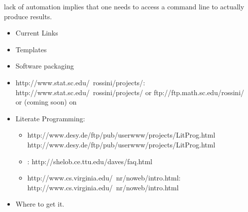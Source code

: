 \documentclass[semhelv]{seminar}
\begin{document}
lack of automation implies that one needs to access a command line to
actually produce results.
 
\begin{itemize}
\item Current Links
\end{itemize}

\begin{slide}

\end{slide}

\begin{itemize}
\item Templates
\item Software packaging
\end{itemize}

\begin{slide}

  \begin{itemize}
  \item {}
    {http://www.stat.sc.edu/~rossini/projects/}:
    {http://www.stat.sc.edu/~rossini/projects/} or
    {ftp://ftp.math.sc.edu/rossini/} or (coming soon) on
  \item Literate Programming:
    \begin{itemize}
    \item {} 
      {http://www.desy.de/ftp/pub/userwww/projects/LitProg.html}
      {http://www.desy.de/ftp/pub/userwww/projects/LitProg.html}
    \item {}:
      {http://shelob.ce.ttu.edu/daves/faq.html}
    \item {}
      {http://www.cs.virginia.edu/~nr/noweb/intro.html}:
      {http://www.cs.virginia.edu/~nr/noweb/intro.html}
      
    \end{itemize}
  \end{itemize}
\end{slide}

\begin{itemize}
\item Where to get it.
\end{itemize}
\end{document}
